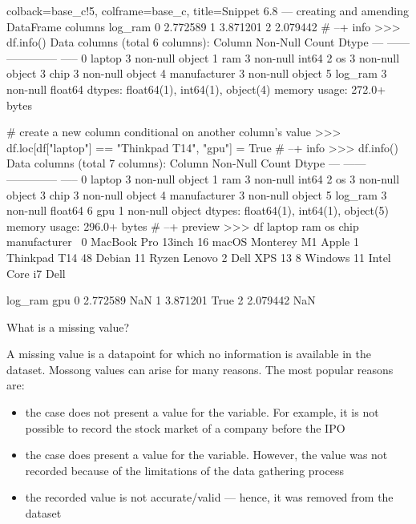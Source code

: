 \documentclass[a4paper,11pt]{book}
\numberwithin{figure}{chapter}
\numberwithin{table}{chapter}
\newcommand{\question}[1]{%
    \begin{tcolorbox}[colback=comp_c!10,colframe=comp_c,sidebyside align=top,width=\linewidth,before skip=1ex]
        #1
    \end{tcolorbox}
    \switchcolumn%
}
\newcommand{\note}[1]{%
    \begin{tcolorbox}[colback=white!0,colframe=white!10,width=\linewidth,before skip=1ex]
        #1
    \end{tcolorbox}
}
\begin{document}
\begin{pythoncode}[linenos=True]{colback=base_c!5, colframe=base_c, title=\sffamily Snippet 6.8 --- creating and amending DataFrame columns}
    log_ram  
0  2.772589  
1  3.871201  
2  2.079442  
# --+ info
>>> df.info()
Data columns (total 6 columns):
     Column        Non-Null Count  Dtype  
---  ------        --------------  -----  
 0   laptop        3 non-null      object 
 1   ram           3 non-null      int64  
 2   os            3 non-null      object 
 3   chip          3 non-null      object 
 4   manufacturer  3 non-null      object 
 5   log_ram       3 non-null      float64
dtypes: float64(1), int64(1), object(4)
memory usage: 272.0+ bytes

# create a new column conditional on another column's value
>>> df.loc[df["laptop"] == "Thinkpad T14", "gpu"] = True
# --+ info
>>> df.info()
Data columns (total 7 columns):
     Column        Non-Null Count  Dtype  
---  ------        --------------  -----  
 0   laptop        3 non-null      object 
 1   ram           3 non-null      int64  
 2   os            3 non-null      object 
 3   chip          3 non-null      object 
 4   manufacturer  3 non-null      object 
 5   log_ram       3 non-null      float64
 6   gpu           1 non-null      object 
dtypes: float64(1), int64(1), object(5)
memory usage: 296.0+ bytes
# --+ preview
>>> df
               laptop  ram              os           chip manufacturer  \
0  MacBook Pro 13inch   16  macOS Monterey             M1        Apple   
1        Thinkpad T14   48       Debian 11          Ryzen       Lenovo   
2         Dell XPS 13    8      Windows 11  Intel Core i7         Dell   

    log_ram   gpu  
0  2.772589   NaN  
1  3.871201  True  
2  2.079442   NaN  
\end{pythoncode}

\begin{paracol}{2}
	\question{\raggedright What is a missing value?}
	\note{A missing value is a datapoint for which no information is available in the dataset. Mossong values can arise for many reasons. The most popular reasons are:
	
	\begin{itemize}
		\item the case does not present a value for the variable. For example, it is not possible to record the stock market of a company before the IPO
		\item the case does present a value for the variable. However, the value was not recorded because of the limitations of the data gathering process
		\item the recorded value is not accurate/valid --- hence, it was removed from the dataset
	\end{itemize}
	}
\end{paracol}
\clearpage 
\end{document}

